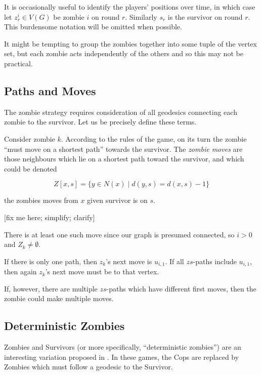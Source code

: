 It is occasionally useful to identify the players' positions over time, in which
case let $z_r^i \in V(G)$ be zombie $i$ on round $r$. Similarly $s_r$ is the
survivor on round $r$. This burdensome notation will be omitted when possible.

It might be tempting to group the zombies together
into some tuple of the vertex set, but each zombie acts independently of
the others and so this may not be practical.

\subsection{Paths and Moves}
The zombie strategy requires consideration of all geodesics connecting
each zombie to the survivor. Let us be precisely define these terms.


Consider zombie $k$. According to the rules of the game, on its turn the zombie
``must move on a shortest path'' towards the survivor. The \textit{zombie moves}
are those neighbours which lie on a shortest path toward the survivor, and which could be denoted

\[ Z[x, s] = \{ y \in N(x) \mid d(y, s) = d(x, s) - 1 \} \]

the zombies moves from $x$ given survivor is on $s$.


[fix me here; simplify; clarify]

There is at least one such move since our graph is presumed connected,
so $i > 0$ and $Z_k \neq \emptyset$.

If there is only one path, then $z_k$'s next move is $u_{i, 1}$. If all $zs$-paths
include $u_{i,1}$, then again $z_k$'s next move must be to that vertex.

If, however, there are multiple $zs$-paths which have different first moves,
then the zombie could make multiple moves.


\subsection{Deterministic Zombies}

Zombies and Survivors (or more specifically, ``deterministic zombies'') are an interesting variation proposed in \cite{fitzpatrick2016deterministic}. In these games, the
Cops are replaced by Zombies which must follow a geodesic to the Survivor.

